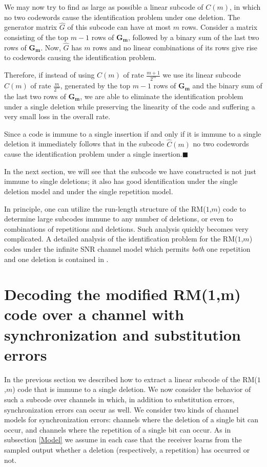 We may now try to find as large as possible a linear subcode of
$C(m)$, in which no two codewords cause the identification problem
under one deletion. The generator matrix $\hat{G}$ of this subcode
can have at most $m$ rows. Consider a matrix consisting of the top
$m-1$ rows of $\mathbf{G_m}$, followed by a binary sum of the last
two rows of $\mathbf{G_m}$. Now, $\hat{G}$ has $m$ rows and no
linear combinations of its rows give rise to codewords causing the
identification problem.

Therefore, if instead of using $C(m)$ of rate $\frac{m+1}{2^m}$ we
use its linear subcode $\hat{C}(m)$ of rate $\frac{m}{2^m}$,
generated by the top $m-1$ rows of $\mathbf{G_m}$ and the binary
sum of the last two rows of $\mathbf{G_m}$, we are able to
eliminate the identification problem under a single deletion while
preserving the linearity of the code and suffering a very small
loss in the overall rate.

\begin{remark}
Since a code is immune to a single insertion if and only if it is
immune to a single deletion \cite{lev:66} it immediately follows
that in the subcode $\hat{C}(m)$ no two codewords cause the
identification problem under a single
insertion.\hfill$\blacksquare$
\end{remark}
In the next section, we will see that the subcode we have
constructed is not just immune to single deletions; it also has
good identification under the single deletion model and under the
single repetition model.

In principle, one can utilize the run-length structure of the
RM($1$,$m$) code to determine large subcodes immune to any number
of deletions, or even to combinations of repetitions and
deletions. Such analysis quickly becomes very complicated. A
detailed analysis of the identification problem for the
RM($1$,$m$) codes under the infinite SNR channel model which
permits {\em both} one repetition
and one deletion is contained in \cite{dRMSupTech:06}. %



\section{Decoding the modified RM(1,m) code over
a channel with synchronization and substitution
errors}\label{sectiondec}

In the previous section we described how to extract a linear
subcode of the RM($1$,$m$) code that is immune to a single
deletion. We now consider the behavior of such a subcode over
channels in which, in addition to substitution errors,
synchronization errors can occur as well. We consider two kinds of
channel models for synchronization errors: channels where the
deletion of a single bit can occur, and channels where the
repetition of  a single bit can occur. As in subsection
\ref{Model} we assume in each case that the receiver learns from
the sampled output whether a deletion (respectively, a repetition)
has occurred or not.

